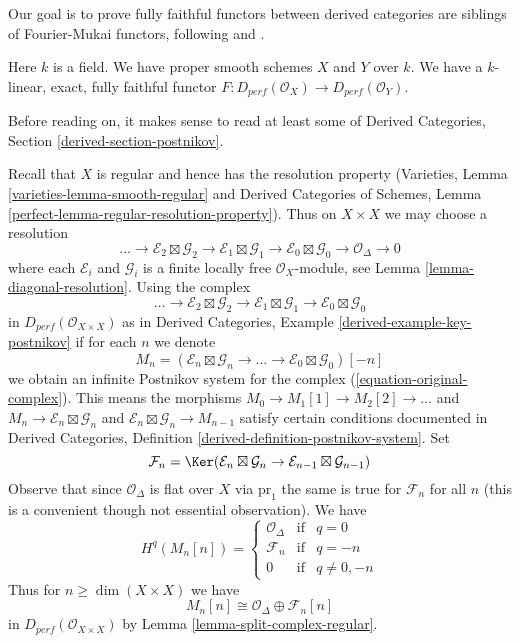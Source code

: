 \noindent
Our goal is to prove fully faithful functors between derived categories
are siblings of Fourier-Mukai functors, following
\cite{Orlov-K3} and \cite{Ballard}.

\begin{situation}
\label{situation-fully-faithful}
Here $k$ is a field. We have proper smooth schemes $X$ and $Y$ over $k$.
We have a $k$-linear, exact, fully faithful functor
$F : D_{perf}(\mathcal{O}_X) \to D_{perf}(\mathcal{O}_Y)$.
\end{situation}

\noindent
Before reading on, it makes sense to read at least some of
Derived Categories, Section \ref{derived-section-postnikov}.

\medskip\noindent
Recall that $X$ is regular and hence has the resolution property
(Varieties, Lemma \ref{varieties-lemma-smooth-regular} and
Derived Categories of Schemes, Lemma
\ref{perfect-lemma-regular-resolution-property}). Thus
on $X \times X$ we may choose a resolution
$$
\ldots \to
\mathcal{E}_2 \boxtimes \mathcal{G}_2 \to
\mathcal{E}_1 \boxtimes \mathcal{G}_1 \to
\mathcal{E}_0 \boxtimes \mathcal{G}_0 \to
\mathcal{O}_\Delta \to 0
$$
where each $\mathcal{E}_i$ and $\mathcal{G}_i$ is a finite locally
free $\mathcal{O}_X$-module, see Lemma \ref{lemma-diagonal-resolution}.
Using the complex
\begin{equation}
\label{equation-original-complex}
\ldots \to
\mathcal{E}_2 \boxtimes \mathcal{G}_2 \to
\mathcal{E}_1 \boxtimes \mathcal{G}_1 \to
\mathcal{E}_0 \boxtimes \mathcal{G}_0
\end{equation}
in $D_{perf}(\mathcal{O}_{X \times X})$ as in
Derived Categories, Example \ref{derived-example-key-postnikov}
if for each $n$ we denote
$$
M_n = (\mathcal{E}_n \boxtimes \mathcal{G}_n \to \ldots \to
\mathcal{E}_0 \boxtimes \mathcal{G}_0)[-n]
$$
we obtain an infinite Postnikov system for the complex
(\ref{equation-original-complex}). This means
the morphisms $M_0 \to M_1[1] \to M_2[2] \to \ldots$ and
$M_n \to \mathcal{E}_n \boxtimes \mathcal{G}_n$ and
$\mathcal{E}_n \boxtimes \mathcal{G}_n \to M_{n - 1}$
satisfy certain conditions documented in
Derived Categories, Definition \ref{derived-definition-postnikov-system}.
Set
$$
\mathcal{F}_n = \Ker(\mathcal{E}_n \boxtimes \mathcal{G}_n \to
\mathcal{E}_{n - 1} \boxtimes \mathcal{G}_{n - 1})
$$
Observe that since $\mathcal{O}_\Delta$ is flat over $X$ via $\text{pr}_1$
the same is true for $\mathcal{F}_n$ for all $n$ (this is a convenient though
not essential observation). We have
$$
H^q(M_n[n]) = \left\{
\begin{matrix}
\mathcal{O}_\Delta & \text{if} & q = 0 \\
\mathcal{F}_n & \text{if} & q = -n \\
0 & \text{if} & q \not = 0, -n
\end{matrix}
\right.
$$
Thus for $n \geq \dim(X \times X)$ we have
$$
M_n[n] \cong \mathcal{O}_\Delta \oplus \mathcal{F}_n[n]
$$
in $D_{perf}(\mathcal{O}_{X \times X})$ by
Lemma \ref{lemma-split-complex-regular}.


